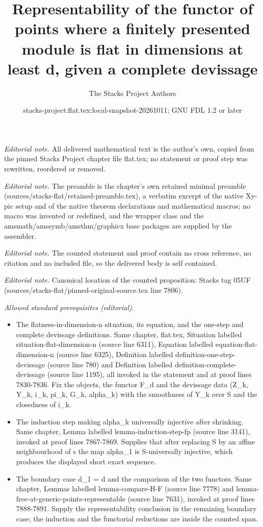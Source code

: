 \documentclass[10pt,a4paper]{amsart}
\title{Representability of the functor of points where a finitely presented module is flat in dimensions at least d, given a complete devissage}
\author{The Stacks Project Authors}
\date{stacks-project:flat.tex:local-snapshot-20261011; GNU FDL 1.2 or later}
\theoremstyle{plain}
\theoremstyle{definition}
\theoremstyle{remark}
\numberwithin{equation}{subsection}
\begin{document}
\maketitle
\noindent\textit{Editorial note.} All delivered mathematical text is the author's own, copied from the pinned Stacks Project chapter file flat.tex; no statement or proof step was rewritten, reordered or removed.\par\medskip
\noindent\textit{Editorial note.} The preamble is the chapter's own retained minimal preamble (sources/stacks-flat/retained-preamble.tex), a verbatim excerpt of the native Xy-pic setup and of the native theorem declarations and mathematical macros; no macro was invented or redefined, and the wrapper class and the amsmath/amssymb/amsthm/graphicx base packages are supplied by the assembler.\par\medskip
\noindent\textit{Editorial note.} The counted statement and proof contain no cross reference, no citation and no included file, so the delivered body is self contained.\par\medskip
\noindent\textit{Editorial note.} Canonical location of the counted proposition: Stacks tag 05UF (sources/stacks-flat/pinned-original-source.tex line 7806).\par\medskip
\noindent\textit{Allowed standard prerequisites (editorial).}\begin{itemize}
\item The flatness-in-dimension-n situation, its equation, and the one-step and complete devissage definitions. Same chapter, flat.tex, Situation labelled situation-flat-dimension-n (source line 6311), Equation labelled equation-flat-dimension-n (source line 6325), Definition labelled definition-one-step-devissage (source line 780) and Definition labelled definition-complete-devissage (source line 1195), all invoked in the statement and at proof lines 7830-7836. Fix the objects, the functor F\_d and the devissage data (Z\_k, Y\_k, i\_k, pi\_k, G\_k, alpha\_k) with the smoothness of Y\_k over S and the closedness of i\_k.
\item The induction step making alpha\_k universally injective after shrinking. Same chapter, Lemma labelled lemma-induction-step-fp (source line 3141), invoked at proof lines 7867-7869. Supplies that after replacing S by an affine neighbourhood of s the map alpha\_1 is S-universally injective, which produces the displayed short exact sequence.
\item The boundary case d\_1 = d and the comparison of the two functors. Same chapter, Lemmas labelled lemma-compare-H-F (source line 7778) and lemma-free-at-generic-points-representable (source line 7631), invoked at proof lines 7888-7891. Supply the representability conclusion in the remaining boundary case; the induction and the functorial reductions are inside the counted span.
\end{itemize}\medskip
\end{document}

